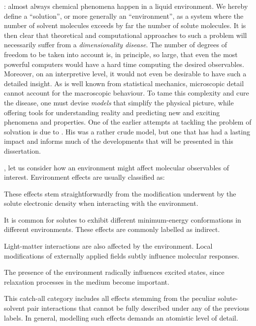 : almost always
chemical phenomena happen in a liquid environment.\autocite{Reichardt2010-le}
We hereby define a \enquote{solution}, or more generally an
\enquote{environment}, as
a system where the number of solvent molecules exceeds by far the number
of solute molecules.\autocite{Tomasi2004-dc, Tomasi2007-es}
It is then clear that theoretical and computational approaches to such a
problem will necessarily suffer from a \emph{dimensionality disease}.
The number of degrees of freedom to be taken into account is, in
principle, so large, that even the most powerful computers
would have a hard time computing the desired observables.
Moreover, on an interpretive level, it would not even be desirable to
have such a detailed insight.
As is well known from statistical mechanics, microscopic detail cannot
account for the macroscopic behaviour.\autocite{Hill1960-ql,
Hansen2013-io}
To tame this complexity and cure the disease, one must devise
\emph{models} that simplify the physical picture, while offering tools for
understanding reality and predicting new and exciting
phenomena and properties.\autocite{Anderson1972-ai, Winsberg2010-sy, Kovac2011-ew}
One of the earlier attempts at tackling the problem of solvation is due
to \citeauthor{Onsager1936-wf}. His was a rather crude model, but one
that has had a lasting impact and informs much of the developments that
will be presented in this dissertation.\autocite{Onsager1936-wf}

, let us consider how an
environment might affect molecular observables of interest.
Environment effects are usually classified as:
\begin{description}[leftmargin=2mm, font=\normalfont]
\item[Direct.]
  These effects stem straightforwardly from the modification underwent by
  the solute electronic density when interacting with the environment.
\item[Indirect.]
  It is common for solutes to exhibit different minimum-energy
  conformations in different environments. These effects are commonly
  labelled as indirect.
\item[Local field.]
  Light-matter interactions are also affected by the environment. Local
  modifications of externally applied fields subtly influence molecular
  responses.\autocite{Cammi1998-jp, Pipolo2014-sd}
\item[Dynamic.]
  The presence of the environment radically influences excited states,
  since relaxation processes in the medium become
  important.\autocite{Aguilar1993-pu, Cammi1995-ah}
\item[Specific.] This catch-all category includes all effects
  stemming from the peculiar solute-solvent pair interactions that
  cannot be fully described under any of the previous labels.
  In general, modelling such effects demands an atomistic level of
  detail.
\end{description}

